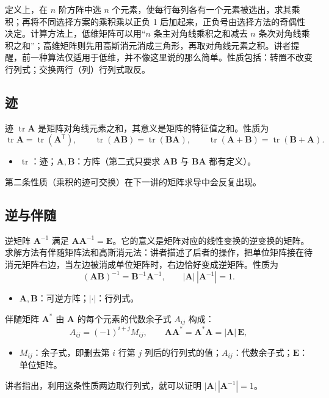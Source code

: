 \documentclass[a4paper]{article}
\begin{document}
定义上，在 $n$ 阶方阵中选 $n$ 个元素，使每行每列各有一个元素被选出，求其乘积；再将不同选择方案的乘积乘以正负 1 后加起来，正负号由选择方法的奇偶性决定。计算方法上，低维矩阵可以用“$n$ 条主对角线乘积之和减去 $n$ 条次对角线乘积之和”；高维矩阵则先用高斯消元消成三角形，再取对角线元素之积。讲者提醒，前一种算法仅适用于低维，并不像这里说的那么简单。性质包括：转置不改变行列式；交换两行（列）行列式取反。

\subsection{迹}

迹 $\operatorname{tr}\boldsymbol A$ 是矩阵对角线元素之和，其意义是矩阵的特征值之和。性质为
\[
\operatorname{tr}\boldsymbol A=\operatorname{tr}(\boldsymbol A^{\mathsf T}),\qquad
\operatorname{tr}(\boldsymbol A\boldsymbol B)=\operatorname{tr}(\boldsymbol B\boldsymbol A),\qquad
\operatorname{tr}(\boldsymbol A+\boldsymbol B)=\operatorname{tr}(\boldsymbol B+\boldsymbol A).
\]
\begin{itemize}
\item $\operatorname{tr}$：迹；$\boldsymbol A,\boldsymbol B$：方阵（第二式只要求 $\boldsymbol A\boldsymbol B$ 与 $\boldsymbol B\boldsymbol A$ 都有定义）。
\end{itemize}
第二条性质（乘积的迹可交换）在下一讲的矩阵求导中会反复出现。

\subsection{逆与伴随}

逆矩阵 $\boldsymbol A^{-1}$ 满足 $\boldsymbol A\boldsymbol A^{-1}=\boldsymbol E$。它的意义是矩阵对应的线性变换的逆变换的矩阵。求解方法有伴随矩阵法和高斯消元法：讲者描述了后者的操作，把单位矩阵接在待消元矩阵右边，当左边被消成单位矩阵时，右边恰好变成逆矩阵。性质为
\[
(\boldsymbol A\boldsymbol B)^{-1}=\boldsymbol B^{-1}\boldsymbol A^{-1},\qquad |\boldsymbol A|\,|\boldsymbol A^{-1}|=1 .
\]
\begin{itemize}
\item $\boldsymbol A,\boldsymbol B$：可逆方阵；$|\cdot|$：行列式。
\end{itemize}

伴随矩阵 $\boldsymbol A^{*}$ 由 $\boldsymbol A$ 的每个元素的代数余子式 $A_{ij}$ 构成：
\[
A_{ij}=(-1)^{i+j}M_{ij},\qquad \boldsymbol A\boldsymbol A^{*}=\boldsymbol A^{*}\boldsymbol A=|\boldsymbol A|\,\boldsymbol E ,
\]
\begin{itemize}
\item $M_{ij}$：余子式，即删去第 $i$ 行第 $j$ 列后的行列式的值；$A_{ij}$：代数余子式；$\boldsymbol E$：单位矩阵。
\end{itemize}
讲者指出，利用这条性质两边取行列式，就可以证明 $|\boldsymbol A|\,|\boldsymbol A^{-1}|=1$。
\end{document}
